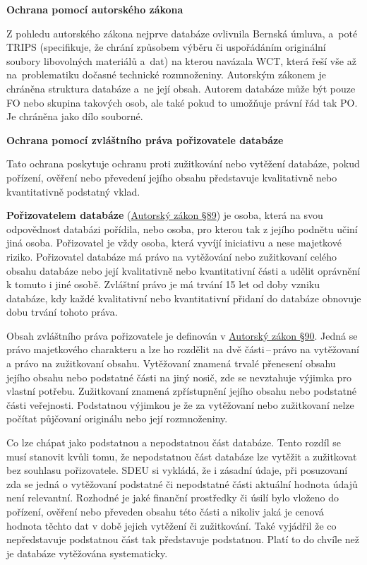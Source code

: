\vspace{0.3cm}
\begin{Large}
\textbf{Ochrana pomocí autorského zákona}
\end{Large}

Z pohledu autorského zákona nejprve databáze ovlivnila Bernská úmluva, a~poté TRIPS (specifikuje, že chrání způsobem výběru či uspořádáním originální soubory libovolných materiálů a~dat) na kterou navázala WCT, která řeší vše až na~problematiku dočasné technické rozmnoženiny. Autorským zákonem je chráněna struktura databáze a~ne její obsah. Autorem databáze může být pouze FO nebo skupina takových osob, ale také pokud to umožňuje právní řád tak PO. Je chráněna jako dílo souborné.

\vspace{0.3cm}
\begin{Large}
\textbf{Ochrana pomocí zvláštního práva pořizovatele databáze}
\end{Large}

Tato ochrana poskytuje ochranu proti zužitkování nebo vytěžení databáze, pokud pořízení, ověření nebo převedení jejího obsahu představuje kvalitativně nebo kvantitativně podstatný vklad.

\textbf{Pořizovatelem databáze} (\href{https://www.zakonyprolidi.cz/cs/2000-121#p89}{Autorský zákon §89}) je osoba, která na svou odpovědnost databázi pořídila, nebo osoba, pro kterou tak z jejího podnětu učiní jiná osoba. Pořizovatel je vždy osoba, která vyvíjí iniciativu a nese majetkové riziko. Pořizovatel databáze má právo na vytěžování nebo zužitkovaní celého obsahu databáze nebo její kvalitativně nebo kvantitativní části a udělit oprávnění k tomuto i jiné osobě. Zvláštní právo je má trvání 15 let od doby vzniku databáze, kdy každé kvalitativní nebo kvantitativní přidaní do databáze obnovuje dobu trvání tohoto práva.

Obsah zvláštního práva pořizovatele je definován v \href{https://www.zakonyprolidi.cz/cs/2000-121#p90}{Autorský zákon §90}. Jedná se právo majetkového charakteru a lze ho rozdělit na dvě části\,--\,právo na vytěžovaní a právo na zužitkovaní obsahu. Vytěžovaní znamená trvalé přenesení obsahu jejího obsahu nebo podstatné části na jiný nosič, zde se nevztahuje výjimka pro vlastní potřebu. Zužitkovaní znamená zpřístupnění jejího obsahu nebo podstatné části veřejnosti. Podstatnou výjimkou je že za vytěžovaní nebo zužitkovaní nelze počítat půjčovaní originálu nebo její rozmnoženiny.

Co lze chápat jako podstatnou a nepodstatnou část databáze. Tento rozdíl se musí stanovit kvůli tomu, že nepodstatnou část databáze lze vytěžit a zužitkovat bez souhlasu pořizovatele. SDEU si vykládá, že i zásadní údaje, při posuzovaní zda se jedná o vytěžovaní podstatné či nepodstatné části aktuální hodnota údajů není relevantní. Rozhodné je jaké finanční prostředky či úsilí bylo vloženo do pořízení, ověření nebo převeden obsahu této části a nikoliv jaká je cenová hodnota těchto dat v době jejich vytěžení či zužitkování. Také vyjádřil že co nepředstavuje podstatnou část tak představuje podstatnou. Platí to do chvíle než je databáze vytěžována systematicky.

